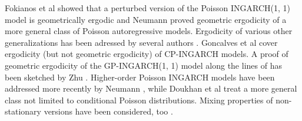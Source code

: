 \documentclass{article}
\begin{document}
Fokianos et al \cite{Fokianos2009} showed that a perturbed version of the Poisson INGARCH(1, 1) model is geometrically ergodic and Neumann \cite[Theorem 3.1]{Neumann2011} proved geometric ergodicity of a more general class of Poisson autoregressive models. Ergodicity of various other generalizations has been adressed by several authors \citep{Davis2016, Douc2013, Neumann2011}. Goncalves et al \citep{Goncalves2015} cover ergodicity (but not geometric ergodicity) of CP-INGARCH models. A proof of geometric ergodicity of the GP-INGARCH(1, 1) model along the lines of \cite{Neumann2011} has been sketched by Zhu \citep{Zhu2012}. Higher-order Poisson INGARCH models have been addressed more recently by Neumann \citep{Neumann2021}, while Doukhan et al \citep{Doukhan2021} treat a more general class not limited to conditional Poisson distributions. Mixing properties of non-stationary versions have been considered, too \cite{Doukhan2021a}. %
\end{document}
